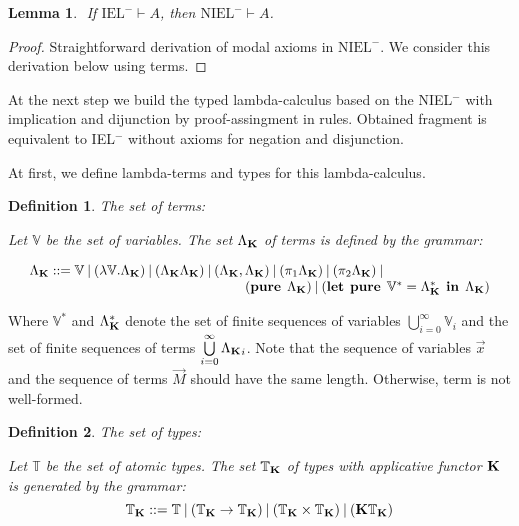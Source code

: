 \documentclass[a4paper]{article}
\newtheorem{lemma}{Lemma}
\newtheorem{defin}{Definition}
\begin{document}
\begin{lemma}
  $ $
  If $\text{IEL}^{-} \vdash A$, then $\text{NIEL}^{-} \vdash A$.
\end{lemma}

\begin{proof}
  Straightforward derivation of modal axioms in $\text{NIEL}^{-}$. We consider this derivation below using terms.
\end{proof}

  \vspace{\baselineskip}

  At the next step we build the typed lambda-calculus based on the NIEL$^{-}$ with implication and dijunction
by proof-assingment in rules. Obtained fragment is equivalent to IEL$^{-}$ without axioms for negation and disjunction.

  At first, we define lambda-terms and types for this lambda-calculus.

  \vspace{\baselineskip}

  \begin{defin} The set of terms:

  Let $\mathbb{V}$ be the set of variables. The set $\Lambda_{{\bf K}}$ of terms is defined by the grammar:

$\begin{array}{lll}
& \Lambda_{{\bf K}} ::= \mathbb{V} \: | \:  (\lambda \mathbb{V}.\Lambda_{{\bf K}}) \: | \: (\Lambda_{{\bf K}}\Lambda_{{\bf K}}) \: | \: (\Lambda_{{\bf K}} , \Lambda_{{\bf K}}) \: | \: (\pi_1 \Lambda_{{\bf K}}) \: | \: (\pi_2 \Lambda_{{\bf K}}) \: | & \\
& \quad\quad\quad\quad\quad\quad\quad\quad\quad\quad\quad\quad\quad\quad\quad\quad ({\bf pure \: } \: \Lambda_{{\bf K}}) \: | \: ({\bf let \:\: pure} \:\: \mathbb{V}^{*} = \Lambda_{{\bf K}}^{*} \:\: {\bf in} \:\: \Lambda_{{\bf K}})
\end{array}$

  \end{defin}

Where $\mathbb{V}^{*}$ and $\Lambda_{{\bf K}}^{*}$ denote the set of finite sequences of variables $\bigcup \limits_{i=0}^{\infty} \mathbb{V}_i$
and the set of finite sequences of terms $\bigcup \limits_{i = 0}^{\infty} {\Lambda_{{\bf K}}}_i $. Note that the sequence of variables $\vec{x}$ and the sequence of terms $\vec{M}$ should have the same length.
Otherwise, term is not well-formed.

  \begin{defin} The set of types:

  Let $\mathbb{T}$ be the set of atomic types. The set $\mathbb{T}_{{\bf K}}$ of types with applicative
  functor ${\bf K}$ is generated by the grammar:
  \begin{equation}
    \mathbb{T}_{{\bf K}} ::= \mathbb{T} \: | \: (\mathbb{T}_{{\bf K}} \to \mathbb{T}_{{\bf K}}) \: |
    \: (\mathbb{T}_{{\bf K}} \times \mathbb{T}_{{\bf K}}) \: | \: ({\bf K}\mathbb{T}_{{\bf K}})
  \end{equation}
  \end{defin}
\end{document}
